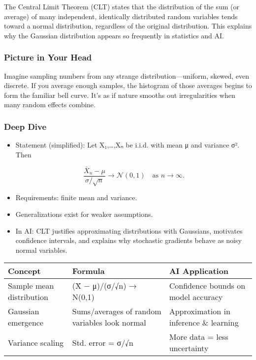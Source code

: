 \documentclass[
  letterpaper,
  DIV=11,
  numbers=noendperiod]{scrreprt}
\begin{document}
The Central Limit Theorem (CLT) states that the distribution of the sum
(or average) of many independent, identically distributed random
variables tends toward a normal distribution, regardless of the original
distribution. This explains why the Gaussian distribution appears so
frequently in statistics and AI.

\subsubsection{Picture in Your Head}\label{picture-in-your-head-127}

Imagine sampling numbers from any strange distribution---uniform,
skewed, even discrete. If you average enough samples, the histogram of
those averages begins to form the familiar bell curve. It's as if nature
smooths out irregularities when many random effects combine.

\subsubsection{Deep Dive}\label{deep-dive-127}

\begin{itemize}
\item
  Statement (simplified): Let X₁,\ldots,Xₙ be i.i.d. with mean μ and
  variance σ². Then

  \[
  \frac{\bar{X}_n - μ}{σ/\sqrt{n}} \to \mathcal{N}(0,1) \quad \text{as } n \to ∞.
  \]
\item
  Requirements: finite mean and variance.
\item
  Generalizations exist for weaker assumptions.
\item
  In AI: CLT justifies approximating distributions with Gaussians,
  motivates confidence intervals, and explains why stochastic gradients
  behave as noisy normal variables.
\end{itemize}

\begin{longtable}[]{@{}
  >{\raggedright\arraybackslash}p{}
  >{\raggedright\arraybackslash}p{}
  >{\raggedright\arraybackslash}p{}@{}}
\toprule\noalign{}
\begin{minipage}[b]{\linewidth}\raggedright
Concept
\end{minipage} & \begin{minipage}[b]{\linewidth}\raggedright
Formula
\end{minipage} & \begin{minipage}[b]{\linewidth}\raggedright
AI Application
\end{minipage} \\
\midrule\noalign{}
\endhead
\bottomrule\noalign{}
\endlastfoot
Sample mean distribution & (X̄ − μ)/(σ/√n) → N(0,1) & Confidence bounds
on model accuracy \\
Gaussian emergence & Sums/averages of random variables look normal &
Approximation in inference \& learning \\
Variance scaling & Std. error = σ/√n & More data = less uncertainty \\
\end{longtable}
\end{document}
